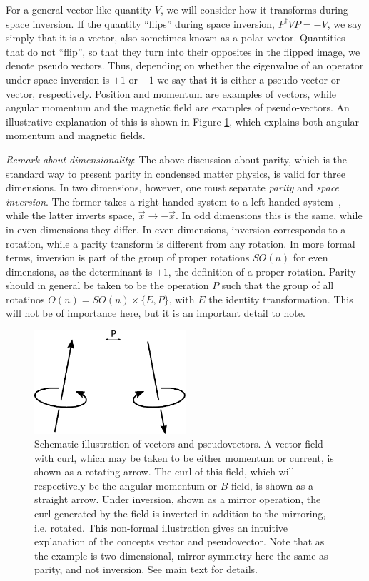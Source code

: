 For a general vector-like quantity $V$, we will consider how it transforms during space inversion.
If the quantity ``flips'' during space inversion, $P^\dagger V P = -V$, we say simply that it is a vector, also sometimes known as a polar vector.
Quantities that do not ``flip'', so that they turn into their opposites in the flipped image, we denote pseudo vectors.
Thus, depending on whether the eigenvalue of an operator under space inversion is $+1$ or $-1$ we say that it is either a pseudo-vector or vector, respectively.
Position and momentum are examples of vectors, while angular momentum and the magnetic field are examples of pseudo-vectors.
An illustrative explanation of this is shown in Figure \ref{fig:pseudovector}, which explains both angular momentum and magnetic fields.

\emph{Remark about dimensionality}: The above discussion about parity, which is the standard way to present parity in condensed matter physics, is valid for three dimensions.
In two dimensions, however, one must separate \emph{parity} and \emph{space inversion}.
The former takes a right-handed system to a left-handed system~\cite{sakuraiModernQuantumMechanics2017}, while the latter inverts space, $\vec{x} \to  -\vec{x}$.
In odd dimensions this is the same, while in even dimensions they differ.
In even dimensions, inversion corresponds to a rotation, while a parity transform is different from any rotation.
In more formal terms, inversion is part of the group of proper  rotations $SO(n)$ for even dimensions, as the determinant is $+1$, the definition of a proper rotation.
Parity should in general be taken to be the operation $P$ such that the group of all rotatinos $O(n) = SO(n) \times \{E, P\}$, with $E$ the identity transformation.
This will not be of importance here, but it is an important detail to note.

\begin{figure}[h]
  \centering
  \includegraphics[width=0.5\textwidth]{figures/pseudovector}
  \caption{Schematic illustration of vectors and pseudovectors.
    A vector field with curl, which may be taken to be either momentum or current, is shown as a rotating arrow.
    The curl of this field, which will respectively be the angular  momentum or $B$-field, is shown as a straight arrow.
    Under inversion, shown as a mirror operation, the curl generated by the field is inverted in addition to the mirroring, i.e. rotated.
    This non-formal illustration gives an intuitive explanation of the concepts vector and pseudovector.
    Note that as the example is two-dimensional, mirror symmetry here the same as parity, and not inversion.
    See main text for details.
  }
  \label{fig:pseudovector}
\end{figure}